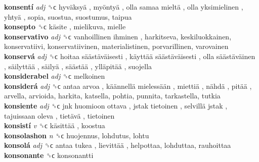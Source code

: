 \textbf{konsentí} \emph{adj}  ␝ϲ   hyväksyä ,  myöntyä ,  olla samaa mieltä ,  olla yksimielinen ,  yhtyä , sopia, suostua, suostumus, taipua  \\
\textbf{konsepto} ␝ϲ   käsite , mielikuva, mielle  \\
\textbf{konservativo} \emph{adj}  ␝ϲ   vanhoillinen ihminen , harkitseva, keskiluokkainen, konservatiivi, konservatiivinen, materialistinen, porvarillinen, varovainen  \\
\textbf{konservá} \emph{adj}  ␝ϲ   hoitaa säästäväisesti ,  käyttää säästäväisesti ,  olla säästäväinen ,  säilyttää ,  säilyä ,  säästää ,  ylläpitää , suojella  \\
\textbf{konsiderabel} \emph{adj}  ␝ϲ  melkoinen  \\
\textbf{konsiderá} \emph{adj}  ␝ϲ   antaa arvoa ,  käännellä mielessään ,  miettiä ,  nähdä ,  pitää , arvella, arvioida, harkita, katsella, pohtia, punnita, tarkastella, tutkia  \\
\textbf{konsiente} \emph{adj}  ␝ϲ   jnk huomioon ottava ,  jstak tietoinen ,  selvillä jstak ,  tajuissaan oleva ,  tietävä , tietoinen  \\
\textbf{konsistí} \emph{v}  ␝ϲ   käsittää , koostua  \\
\textbf{konsolashon} \emph{n}  ␝ϲ  huojennus, lohdutus, lohtu  \\
\textbf{konsolá} \emph{adj}  ␝ϲ   antaa tukea ,  lievittää , helpottaa, lohduttaa, rauhoittaa  \\
\textbf{konsonante} ␝ϲ  konsonantti  \\
